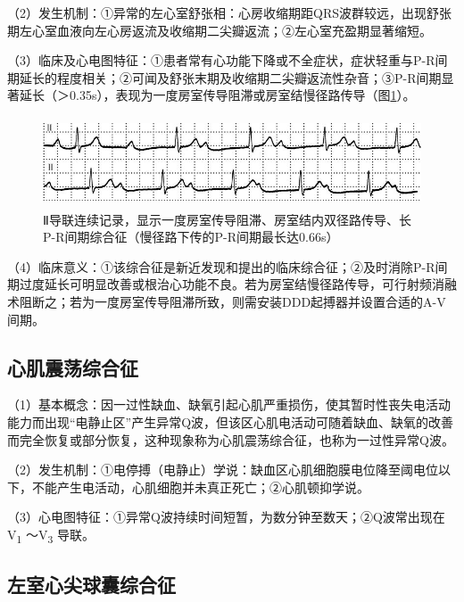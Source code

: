 （2）发生机制：①异常的左心室舒张相：心房收缩期距QRS波群较远，出现舒张期左心室血液向左心房返流及收缩期二尖瓣返流；②左心室充盈期显著缩短。

（3）临床及心电图特征：①患者常有心功能下降或不全症状，症状轻重与P-R间期延长的程度相关；②可闻及舒张末期及收缩期二尖瓣返流性杂音；③P-R间期显著延长（＞0.35s），表现为一度房室传导阻滞或房室结慢径路传导（图\ref{fig40-16}）。

\begin{figure}[!htbp]
 \centering
 \includegraphics[width=5.19792in,height=1.05208in]{./images/Image00678.jpg}
 \captionsetup{justification=centering}
 \caption{Ⅱ导联连续记录，显示一度房室传导阻滞、房室结内双径路传导、长P-R间期综合征（慢径路下传的P-R间期最长达0.66s）}
 \label{fig40-16}
  \end{figure} 

（4）临床意义：①该综合征是新近发现和提出的临床综合征；②及时消除P-R间期过度延长可明显改善或根治心功能不良。若为房室结慢径路传导，可行射频消融术阻断之；若为一度房室传导阻滞所致，则需安装DDD起搏器并设置合适的A-V间期。

\protect\hypertarget{text00047.htmlux5cux23subid570}{}{}

\subsection{心肌震荡综合征}

（1）基本概念：因一过性缺血、缺氧引起心肌严重损伤，使其暂时性丧失电活动能力而出现“电静止区”产生异常Q波，但该区心肌电活动可随着缺血、缺氧的改善而完全恢复或部分恢复，这种现象称为心肌震荡综合征，也称为一过性异常Q波。

（2）发生机制：①电停搏（电静止）学说：缺血区心肌细胞膜电位降至阈电位以下，不能产生电活动，心肌细胞并未真正死亡；②心肌顿抑学说。

（3）心电图特征：①异常Q波持续时间短暂，为数分钟至数天；②Q波常出现在V\textsubscript{1}
～V\textsubscript{3} 导联。

\protect\hypertarget{text00047.htmlux5cux23subid571}{}{}

\subsection{左室心尖球囊综合征}

